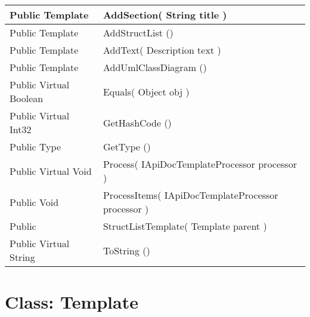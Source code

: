 \documentclass[11pt, oneside, a4paper]{book}
\begin{document}
\begin{center}
\begin{tabular}{| p{3cm} | p{12cm} | }
\hline
 Public  Template &  AddSection(\hypertarget{SoftwareEngineeringTools.{}Documentation.{}StructListTemplate.{}AddSection\_String}{} String  title  )\\
\hline
 Public  Template &  AddStructList ()\hypertarget{SoftwareEngineeringTools.{}Documentation.{}StructListTemplate.{}AddStructList}{}\\
\hline
 Public  Template &  AddText(\hypertarget{SoftwareEngineeringTools.{}Documentation.{}StructListTemplate.{}AddText\_Description}{} Description  text  )\\
\hline
 Public  Template &  AddUmlClassDiagram ()\hypertarget{SoftwareEngineeringTools.{}Documentation.{}StructListTemplate.{}AddUmlClassDiagram}{}\\
\hline
 Public  Virtual  Boolean &  Equals(\hypertarget{SoftwareEngineeringTools.{}Documentation.{}StructListTemplate.{}Equals\_Object}{} Object  obj  )\\
\hline
 Public  Virtual  Int32 &  GetHashCode ()\hypertarget{SoftwareEngineeringTools.{}Documentation.{}StructListTemplate.{}GetHashCode}{}\\
\hline
 Public  Type &  GetType ()\hypertarget{SoftwareEngineeringTools.{}Documentation.{}StructListTemplate.{}GetType}{}\\
\hline
 Public  Virtual  Void &  Process(\hypertarget{SoftwareEngineeringTools.{}Documentation.{}StructListTemplate.{}Process\_IApiDocTemplateProcessor}{} IApiDocTemplateProcessor  processor  )\\
\hline
 Public  Void &  ProcessItems(\hypertarget{SoftwareEngineeringTools.{}Documentation.{}StructListTemplate.{}ProcessItems\_IApiDocTemplateProcessor}{} IApiDocTemplateProcessor  processor  )\\
\hline
 Public  &  StructListTemplate(\hypertarget{SoftwareEngineeringTools.{}Documentation.{}StructListTemplate.{}StructListTemplate\_Template}{} Template  parent  )\\
\hline
 Public  Virtual  String &  ToString ()\hypertarget{SoftwareEngineeringTools.{}Documentation.{}StructListTemplate.{}ToString}{}\\
\hline
\end{tabular}
\end{center}
 


\hypertarget{SoftwareEngineeringTools.{}Documentation.{}Template}{}
\section{Class: Template}
\end{document}
